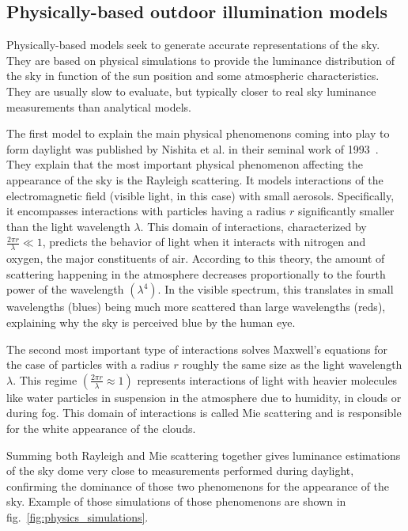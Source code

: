 \subsection{Physically-based outdoor illumination models}

Physically-based models seek to generate accurate representations of the sky. They are based on physical simulations to provide the luminance distribution of the sky in function of the sun position and some atmospheric characteristics. They are usually slow to evaluate, but typically closer to real sky luminance measurements than analytical models.

The first model to explain the main physical phenomenons coming into play to form daylight was published by Nishita et al. in their seminal work of 1993~\cite{nishita1993display}. They explain that the most important physical phenomenon affecting the appearance of the sky is the Rayleigh scattering. It models interactions of the electromagnetic field (visible light, in this case) with small aerosols. Specifically, it encompasses interactions with particles having a radius $r$ significantly smaller than the light wavelength $\lambda$. This domain of interactions, characterized by $\frac{2\pi r}{\lambda} \ll 1$, predicts the behavior of light when it interacts with nitrogen and oxygen, the major constituents of air. According to this theory, the amount of scattering happening in the atmosphere decreases proportionally to the fourth power of the wavelength $\left(\lambda^4\right)$. In the visible spectrum, this translates in small wavelengths (blues) being much more scattered than large wavelengths (reds), explaining why the sky is perceived blue by the human eye.

The second most important type of interactions solves Maxwell's equations for the case of particles with a radius $r$ roughly the same size as the light wavelength $\lambda$. This regime $\left( \frac{2\pi r}{\lambda} \approx 1 \right)$ represents interactions of light with heavier molecules like water particles in suspension in the atmosphere due to humidity, in clouds or during fog. This domain of interactions is called Mie scattering and is responsible for the white appearance of the clouds.

Summing both Rayleigh and Mie scattering together gives luminance estimations of the sky dome very close to measurements performed during daylight, confirming the dominance of those two phenomenons for the appearance of the sky. Example of those simulations of those phenomenons are shown in fig.~\ref{fig:physics_simulations}.

